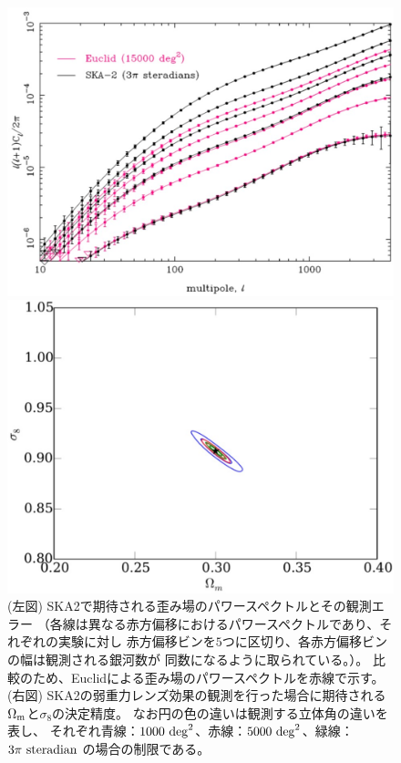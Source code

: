 \begin{figure}[t]
 \begin{minipage}{0.53\hsize}
 \begin{center}
   \includegraphics[width=1.0\linewidth]{cosmology/WL_power.eps} 
 \end{center}
 \end{minipage}
 \begin{minipage}{0.51\hsize}
 \begin{center}
   \includegraphics[width=1.0\linewidth]{cosmology/WL_constraint.eps} 
 \end{center}
 \end{minipage}
\caption{(左図) SKA2で期待される歪み場のパワースペクトルとその観測エラー
（各線は異なる赤方偏移におけるパワースペクトルであり、それぞれの実験に対し
赤方偏移ビンを$5$つに区切り、各赤方偏移ビンの幅は観測される銀河数が
同数になるように取られている。）。
比較のため、Euclidによる歪み場のパワースペクトルを赤線で示す。
(右図) SKA2の弱重力レンズ効果の観測を行った場合に期待される
$\Omega_{\rm m}$と$\sigma_{8}$の決定精度。
なお円の色の違いは観測する立体角の違いを表し、
それぞれ青線：$1000~{\rm deg}^2$、赤線：$5000~{\rm deg}^2$、緑線：$3\pi~{\rm steradian}$
の場合の制限である\citep{Brown:2015vqa}\label{fig:WL_fig1}。}
\end{figure}
